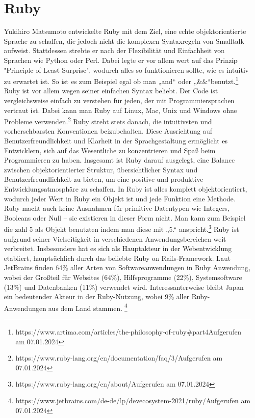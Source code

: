 \documentclass{article}
\begin{document}
\section*{Ruby}


Yukihiro Matsumoto entwickelte Ruby mit dem Ziel, eine echte objektorientierte Sprache zu schaffen, die jedoch nicht die komplexen Syntaxregeln von Smalltalk aufweist. Stattdessen strebte er nach der Flexibilität und Einfachheit von Sprachen wie Python oder Perl. Dabei legte er vor allem wert auf das Prinzip "Principle of Least Surprise", wodurch alles so funktionieren sollte, wie es intuitiv zu erwartet ist. So ist es zum Beispiel egal ob man „and“ oder „\&\&“benutzt.\footnote{https://www.artima.com/articles/the-philosophy-of-ruby\#part4Aufgerufen am 07.01.2024}
Ruby ist vor allem wegen seiner einfachen Syntax beliebt. Der Code ist vergleichsweise einfach zu verstehen für jeden, der mit Programmiersprachen vertraut ist. Dabei kann man Ruby auf Linux, Mac, Unix und Windows ohne Probleme verwenden.\footnote{https://www.ruby-lang.org/en/documentation/faq/3/Aufgerufen am 07.01.2024}
Ruby strebt stets danach, die intuitivsten und vorhersehbarsten Konventionen beizubehalten. Diese Ausrichtung auf Benutzerfreundlichkeit und Klarheit in der Sprachgestaltung ermöglicht es Entwicklern, sich auf das Wesentliche zu konzentrieren und Spaß beim Programmieren zu haben. Insgesamt ist Ruby darauf ausgelegt, eine Balance zwischen objektorientierter Struktur, übersichtlicher Syntax und Benutzerfreundlichkeit zu bieten, um eine positive und produktive Entwicklungsatmosphäre zu schaffen.
In Ruby ist alles komplett objektorientiert, wodurch jeder Wert in Ruby ein Objekt ist und jede Funktion eine Methode. Ruby macht auch keine Ausnahmen für primitive Datentypen wie Integers, Booleans oder Null – sie existieren in dieser Form nicht. Man kann zum Beispiel die zahl 5 als Objekt benutzten indem man diese mit „5.“ anspricht.\footnote{https://www.ruby-lang.org/en/about/Aufgerufen am 07.01.2024}
Ruby ist aufgrund seiner Vielseitigkeit in verschiedenen Anwendungsbereichen weit verbreitet. Insbesondere hat es sich als Hauptakteur in der Webentwicklung etabliert, hauptsächlich durch das beliebte Ruby on Rails-Framework. Laut JetBrains finden 64\% aller Arten von Softwareanwendungen in Ruby Anwendung, wobei der Großteil für Websites (64\%), Hilfsprogramme (22\%), Systemsoftware (13\%) und Datenbanken (11\%) verwendet wird.
Interessanterweise bleibt Japan ein bedeutender Akteur in der Ruby-Nutzung, wobei 9\% aller Ruby-Anwendungen aus dem Land stammen. \footnote{https://www.jetbrains.com/de-de/lp/devecosystem-2021/ruby/Aufgerufen am 07.01.2024}
\end{document}
